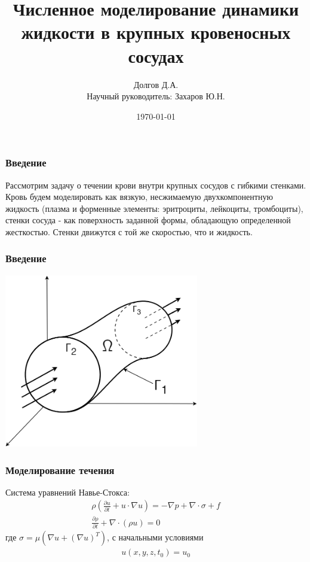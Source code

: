 \documentclass[14pt]{beamer}
\title[Моделирование динамики жидкости в сосудах]{Численное моделирование динамики жидкости в крупных кровеносных сосудах}
\date{\today}
\author[Долгов Д.А.]{Долгов Д.А.\\{\small Научный руководитель: Захаров Ю.Н.}}
\institute{Кемеровский Государственный Университет \\
    \vspace{0.7cm}
    \vspace{0.7cm}
}
\begin{document}
\maketitle

\begin{frame}
\frametitle{Введение}
Рассмотрим задачу о течении крови внутри крупных сосудов с гибкими стенками. Кровь будем моделировать как вязкую, несжимаемую двухкомпонентную жидкость (плазма и форменные элементы: эритроциты, лейкоциты, тромбоциты), стенки сосуда - как поверхность заданной формы, обладающую определенной жесткостью. Стенки движутся с той же скоростью, что и жидкость.
\end{frame}

\begin{frame}
\frametitle{Введение}
    \begin{center}
        \includegraphics[width=8.5cm]{area_3d.png}
    \end{center}
\end{frame}

\begin{frame}
\frametitle{Моделирование течения}
Система уравнений Навье-Стокса:
\begin{gather}
    \label{eq:motion}
    \rho ( \frac{\partial u}{\partial t} + u \cdot \nabla u) = - \nabla p + \nabla \cdot \sigma + f\\
    \label{eq:continuity}
    \frac{\partial \rho}{\partial t} + \nabla \cdot (\rho u) = 0 
\end{gather}
где $\sigma = \mu (\nabla u + (\nabla u)^{T})$, с начальными условиями
\begin{gather}
    u(x, y, z, t_0) = u_0
\end{gather}

\end{frame}
\end{document}

